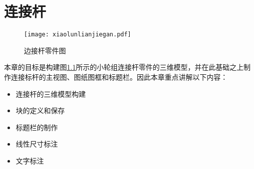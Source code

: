 \chapter{连接杆}
\begin{figure}[htbp]
\centering
\texttt{[image: xiaolunlianjiegan.pdf]}
\caption{边接杆零件图}\label{fig:xiaolunlianjiegan}
\end{figure}

本章的目标是构建图\ref{fig:xiaolunlianjiegan}所示的小轮组连接杆零件的三维模型，并在此基础之上制作连接标杆的主视图、图纸图框和标题栏。因此本章重点讲解以下内容：
\begin{itemize}
\item 连接杆的三维模型构建
\item 块的定义和保存
\item 标题栏的制作
\item 线性尺寸标注
\item 文字标注
\end{itemize}


%
\endinput